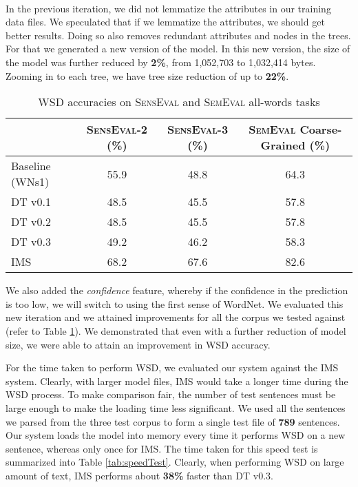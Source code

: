 \documentclass[a4paper,12pt]{nurop}
\begin{document}
\paragraph{}
In the previous iteration, we did not lemmatize the attributes in our training data files. We speculated that if we lemmatize the attributes, we should get better results. Doing so also removes redundant attributes and nodes in the trees. For that we generated a new version of the model. In this new version, the size of the model was further reduced by \textbf{2\%}, from 1,052,703 to 1,032,414 bytes. Zooming in to each tree, we have tree size reduction of up to \textbf{22\%}.
\begin{table}
\center
\footnotesize
	\begin{tabular}[h]{| l | c | c | c |}
		\hline
		& \textsc{SensEval-2} (\%) & \textsc{SensEval-3} (\%) & \textsc{SemEval} Coarse-Grained (\%) \\
		\hline
		Baseline (WNs1) & 55.9 & 48.8 & 64.3 \\
		\hline
		DT v0.1 & 48.5 & 45.5 & 57.8 \\
		\hline
		DT v0.2 & 48.5 & 45.5 & 57.8 \\
		\hline
		DT v0.3 & 49.2 & 46.2 & 58.3 \\
		\hline
		IMS & 68.2 & 67.6 & 82.6 \\
		\hline
	\end{tabular}
	\vspace{-1mm}
	\caption{WSD accuracies on \textsc{SensEval} and \textsc{SemEval} all-words tasks}
	\vspace{1mm}
	\label{tab:resultsSum}
\end{table}

We also added the \textit{confidence} feature, whereby if the confidence in the prediction is too low, we will switch to using the first sense of WordNet. We evaluated this new iteration and we attained improvements for all the corpus we tested against (refer to Table \ref{tab:resultsSum}). We demonstrated that even with a further reduction of model size, we were able to attain an improvement in WSD accuracy.

For the time taken to perform WSD, we evaluated our system against the IMS system. Clearly, with larger model files, IMS would take a longer time during the WSD process. To make comparison fair, the number of test sentences must be large enough to make the loading time less significant. We used all the sentences we parsed from the three test corpus to form a single test file of \textbf{789} sentences. Our system loads the model into memory every time it performs WSD on a new sentence, whereas only once for IMS. The time taken for this speed test is summarized into Table \ref{tab:speedTest}. Clearly, when performing WSD on large amount of text, IMS performs about \textbf{38\%} faster than DT v0.3.
\end{document}
